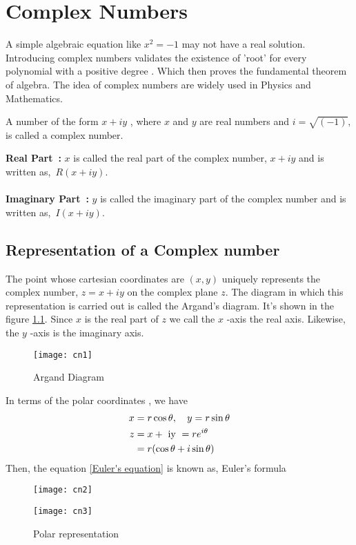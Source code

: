 \chapter{Complex Numbers}
A simple algebraic equation like $x^{2}=-1$ may not have a real solution. Introducing complex numbers validates the existence of 'root' for every polynomial with a positive degree . Which then proves the fundamental theorem of algebra. The idea of complex numbers are widely used in Physics and Mathematics.
\begin{definition}
	A number of the form {${x+i y}$} , where $x$ and $y$ are real numbers and $i=\sqrt{(-1)},$ is called a complex number.
\end{definition}
	\textbf{\large Real Part\ \hspace{1.08cm}:} $x$ is called the real part of the complex number,  $x+i y$ and is written as,\ ${{R(x+i y)}}$.\\\\ 
	\textbf{\large Imaginary Part\ :} $y$ is called the imaginary part of the complex number and is written as,\ ${I(x+i y)}$.
	\section{Representation of a Complex number}
The point whose cartesian coordinates are $(x, y)$ uniquely
represents the complex number, {${z=x+i y}$} on the complex plane $z$. The diagram in which this representation is carried out is called the Argand's diagram. It's shown in the figure \ref{Argand Diagram}.  Since $x$ is the real part of $z$ we call the $x$ -axis the real axis. Likewise, the $y$ -axis is the imaginary axis.

		\begin{figure}[H]
				\begin{center}
			\texttt{[image: cn1]}
				\end{center}
			\caption{Argand Diagram}
			\label{Argand Diagram}
	    \end{figure}
    In terms of the polar coordinates  , we have
    \begin{align}
    x&=r \cos \theta, \quad y=r \sin \theta\\
    z&=x+\text { iy }=re^{i\theta} \notag \\&=r(\cos \theta+i \sin \theta)
    \label{Euler's equation}
    \end{align}
    Then, the  equation \ref{Euler's equation} is known as, Euler's formula
    \begin{figure}[H]
    	\begin{minipage}{0.40\textwidth}
    		\begin{center}
    		\texttt{[image: cn2]}
    	\end{center}
    	\end{minipage}\hfil
    	\begin{minipage}{0.40\textwidth}
    	\begin{center}
    		\texttt{[image: cn3]}
    	\end{center}
    \end{minipage}
    
    \caption{Polar representation}
    \end{figure}
